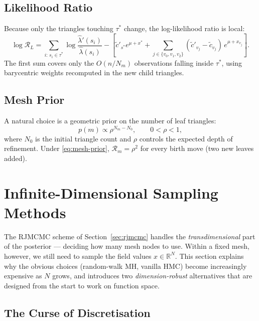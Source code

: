 \documentclass[11pt]{article}
\begin{document}
\subsection{Likelihood Ratio}
\label{sec:rj-ll}

Because only the triangles touching $\tau^*$ change, the log-likelihood ratio
is local:
\begin{equation}
  \log\mathcal{R}_L
  = \!\sum_{i:\,s_i\in\tau^*}\!\!\!\log\frac{\hat\lambda'(s_i)}{\hat\lambda(s_i)}
  - \left[\tilde{c}'_{s^*}e^{\mu+x^*}
    + \sum_{j\in\{v_0,v_1,v_2\}}\!(\tilde{c}'_{v_j}-\tilde{c}_{v_j})\,e^{\mu+x_{v_j}}\right].
  \label{eq:rj-ll}
\end{equation}
The first sum covers only the $O(n/N_m)$ observations falling inside $\tau^*$,
using barycentric weights recomputed in the new child triangles.

\subsection{Mesh Prior}
\label{sec:mesh-prior}

A natural choice is a geometric prior on the number of leaf triangles:
\begin{equation}
  p(m) \propto \rho^{N_m-N_0}, \qquad 0<\rho<1,
  \label{eq:mesh-prior}
\end{equation}
where $N_0$ is the initial triangle count and $\rho$ controls the expected
depth of refinement.  Under \eqref{eq:mesh-prior}, $\mathcal{R}_m=\rho^2$
for every birth move (two new leaves added).
\section{Infinite-Dimensional Sampling Methods}
\label{sec:inf-dim-samplers}

The RJMCMC scheme of Section~\ref{sec:rjmcmc} handles the \emph{transdimensional}
part of the posterior — deciding how many mesh nodes to use.  Within a fixed mesh,
however, we still need to sample the field values $x \in \mathbb{R}^N$.  This
section explains why the obvious choices (random-walk MH, vanilla HMC) become
increasingly expensive as $N$ grows, and introduces two \emph{dimension-robust}
alternatives that are designed from the start to work on function space.

\subsection{The Curse of Discretisation}
\label{sec:curse-disc}
\end{document}
